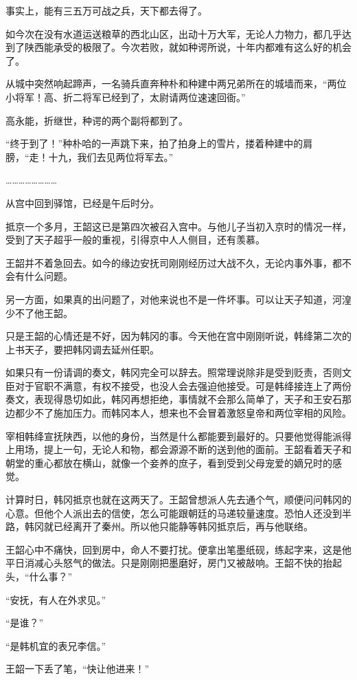 事实上，能有三五万可战之兵，天下都去得了。

如今次在没有水道运送粮草的西北山区，出动十万大军，无论人力物力，都几乎达到了陕西能承受的极限了。今次若败，就如种谔所说，十年内都难有这么好的机会了。

从城中突然响起蹄声，一名骑兵直奔种朴和种建中两兄弟所在的城墙而来，“两位小将军！高、折二将军已经到了，太尉请两位速速回衙。”

高永能，折继世，种谔的两个副将都到了。

“终于到了！”种朴哈的一声跳下来，拍了拍身上的雪片，搂着种建中的肩膀，“走！十九，我们去见两位将军去。”

……………………

从宫中回到驿馆，已经是午后时分。

抵京一个多月，王韶这已是第四次被召入宫中。与他儿子当初入京时的情况一样，受到了天子超乎一般的重视，引得京中人人侧目，还有羡慕。

王韶并不着急回去。如今的缘边安抚司刚刚经历过大战不久，无论内事外事，都不会有什么问题。

另一方面，如果真的出问题了，对他来说也不是一件坏事。可以让天子知道，河湟少不了他王韶。

只是王韶的心情还是不好，因为韩冈的事。今天他在宫中刚刚听说，韩绛第二次的上书天子，要把韩冈调去延州任职。

如果只有一份请调的奏文，韩冈完全可以辞去。照常理说除非是受到贬责，否则文臣对于官职不满意，有权不接受，也没人会去强迫他接受。可是韩绛接连上了两份奏文，表现得恳切如此，韩冈再想拒绝，事情就不会那么简单了，天子和王安石那边都少不了施加压力。而韩冈本人，想来也不会冒着激怒皇帝和两位宰相的风险。

宰相韩绛宣抚陕西，以他的身份，当然是什么都能要到最好的。只要他觉得能派得上用场，提上一句，无论人和物，都会源源不断的送到他的面前。王韶看着天子和朝堂的重心都放在横山，就像一个妾养的庶子，看到受到父母宠爱的嫡兄时的感觉。

计算时日，韩冈抵京也就在这两天了。王韶曾想派人先去通个气，顺便问问韩冈的心意。但他个人派出去的信使，怎么可能跟朝廷的马递较量速度。恐怕人还没到半路，韩冈就已经离开了秦州。所以他只能静等韩冈抵京后，再与他联络。

王韶心中不痛快，回到房中，命人不要打扰。便拿出笔墨纸砚，练起字来，这是他平日消减心头怒气的做法。只是刚刚把墨磨好，房门又被敲响。王韶不快的抬起头，“什么事？”

“安抚，有人在外求见。”

“是谁？”

“是韩机宜的表兄李信。”

王韶一下丢了笔，“快让他进来！”


